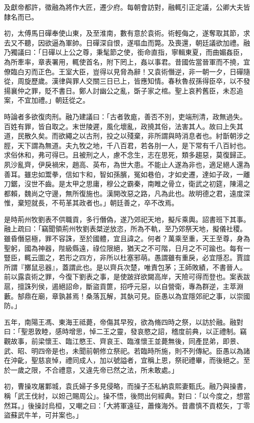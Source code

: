 \begin{pinyinscope}
及獻帝都許，徵融為將作大匠，遷少府。每朝會訪對，融輒引正定議，公卿大夫皆隸名而已。

初，太傅馬日磾奉使山東，及至淮南，數有意於袁術。術輕侮之，遂奪取其節，求去又不聽，因欲逼為軍帥。日磾深自恨，遂嘔血而斃。及喪還，朝廷議欲加禮。融乃獨議曰：「日磾以上公之尊，秉髦節之使，銜命直指，寧輯東夏，而曲媚姦臣，為所牽率，章表署用，輒使首名，附下罔上，姦以事君。昔國佐當晉軍而不撓，宜僚臨白刃而正色。王室大臣，豈得以見脅為辭！又袁術僭逆，非一朝一夕，日磾隨從，周旋歷歲。漢律與罪人交關三日已上，皆應知情。春秋魯叔孫得臣卒，以不發揚襄仲之罪，貶不書日。鄭人討幽公之亂，斲子家之棺。聖上哀矜舊臣，未忍追案，不宜加禮。」朝廷從之。

時論者多欲復肉刑。融乃建議曰：「古者敦庬，善否不別，吏端刑清，政無過失。百姓有罪，皆自取之。末世陵遲，風化壞亂，政撓其俗，法害其人。故曰上失其道，民散久矣。而欲繩之以古刑，投之以殘棄，非所謂與時消息者也。紂斮朝涉之脛，天下謂為無道。夫九牧之地，千八百君，若各刖一人，是下常有千八百紂也。求俗休和，弗可得已。且被刑之人，慮不念生，志在思死，類多趨惡，莫復歸正。夙沙亂齊，伊戾禍宋，趙高、英布，為世大患。不能止人遂為非也，適足絕人還為善耳。雖忠如鬻拳，信如卞和，智如孫臏，冤如巷伯，才如史遷，達如子政，一離刀鋸，沒世不齒。是太甲之思庸，穆公之霸秦，南睢之骨立，衛武之初筵，陳湯之都賴，魏尚之守邊，無所復施也。漢開改惡之路，凡為此也。故明德之君，遠度深惟，棄短就長，不苟革其政者也。」朝廷善之，卒不改焉。

是時荊州牧劉表不供職貢，多行僭偽，遂乃郊祀天地，擬斥乘輿。詔書班下其事。融上疏曰：「竊聞領荊州牧劉表桀逆放恣，所為不軌，至乃郊祭天地，擬儀社稷。雖昏僭惡極，罪不容誅，至於國體，宜且諱之。何者？萬乘至重，天王至尊，身為聖躬，國為神器，陛級縣遠，祿位限絕，猶天之不可階，日月之不可踰也。每有一豎臣，輒云圖之，若形之四方，非所以杜塞邪萌。愚謂雖有重戾，必宜隱忍。賈誼所謂『擲鼠忌器』，蓋謂此也。是以齊兵次楚，唯責包茅；王師敗績，不書晉人。前以露袁術之罪，今復下劉表之事，是使跛牂欲闚高岸，天險可得而登也。案表跋扈，擅誅列侯，遏絕詔命，斷盜貢篚，招呼元惡，以自營衛，專為群逆，主萃淵藪。郜鼎在廟，章孰甚焉！桑落瓦解，其埶可見。臣愚以為宜隱郊祀之事，以崇國防。」

五年，南陽王馮、東海王祗薨，帝傷其早歿，欲為脩四時之祭，以訪於融。融對曰：「聖恩敦睦，感時增思，悼二王之靈，發哀愍之詔，稽度前典，以正禮制。竊觀故事，前梁懷王、臨江愍王、齊哀王、臨淮懷王並薨無後，同產昆弟，即景、武、昭、明四帝是也，未聞前朝修立祭祀。若臨時所施，則不列傳紀。臣愚以為諸在沖齔，聖慈哀悼，禮同成人，加以號謚者，宜稱上恩，祭祀禮畢，而後絕之。至於一歲之限，不合禮意，又違先帝已然之法，所未敢處。」

初，曹操攻屠鄴城，袁氏婦子多見侵略，而操子丕私納袁熙妻甄氏。融乃與操書，稱「武王伐紂，以妲己賜周公」。操不悟，後問出何經典。對曰：「以今度之，想當然耳。」後操討烏桓，又嘲之曰：「大將軍遠征，蕭條海外。昔肅慎不貢楛矢，丁零盜蘇武牛羊，可并案也。」


\end{pinyinscope}
